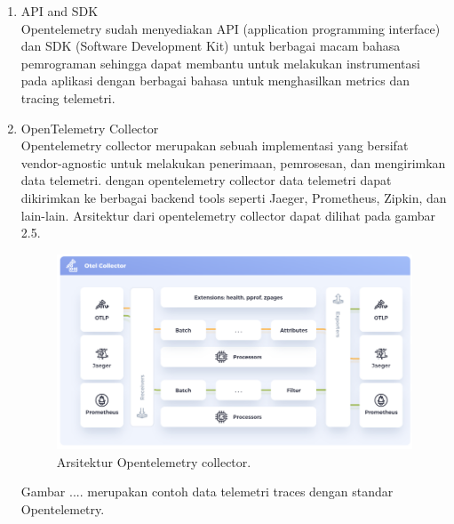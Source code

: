   \begin{enumerate}
    \item API and SDK\\
    Opentelemetry sudah menyediakan API (application programming interface) dan SDK (Software Development Kit) untuk berbagai macam bahasa pemrograman sehingga dapat membantu untuk melakukan instrumentasi pada aplikasi dengan berbagai bahasa untuk menghasilkan metrics dan tracing telemetri.
    \item OpenTelemetry Collector\\
    Opentelemetry collector merupakan sebuah implementasi yang bersifat vendor-agnostic untuk melakukan penerimaan, pemrosesan, dan mengirimkan data telemetri. dengan opentelemetry collector data telemetri dapat dikirimkan ke berbagai backend tools seperti Jaeger, Prometheus, Zipkin, dan lain-lain\cite{OtelCollector}. Arsitektur dari opentelemetry collector dapat dilihat pada gambar 2.5.

      \begin{figure}[H]
        \centering
          \includegraphics[scale=0.7]{gambar/otel-collector}
          \caption{Arsitektur Opentelemetry collector.}
          \label{Arsitektur Opentelemetry collector.}
      \end{figure}
      
    Gambar .... merupakan contoh data telemetri traces dengan standar Opentelemetry.


\end{enumerate}
